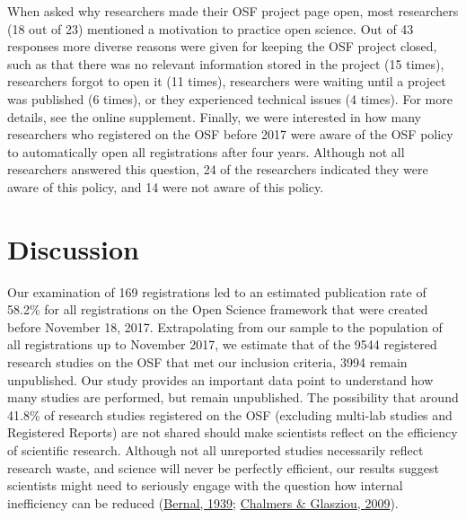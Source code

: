 \documentclass[
  ,jou, a4paper,floatsintext]{apa6}
\begin{document}
When asked why researchers made their OSF project page open, most researchers (18 out of 23) mentioned a motivation to practice open science. Out of 43 responses more diverse reasons were given for keeping the OSF project closed, such as that there was no relevant information stored in the project (15 times), researchers forgot to open it (11 times), researchers were waiting until a project was published (6 times), or they experienced technical issues (4 times). For more details, see the online supplement. Finally, we were interested in how many researchers who registered on the OSF before 2017 were aware of the OSF policy to automatically open all registrations after four years. Although not all researchers answered this question, 24 of the researchers indicated they were aware of this policy, and 14 were not aware of this policy.

\hypertarget{discussion}{%
\section{Discussion}\label{discussion}}

Our examination of 169 registrations led to an estimated publication rate of 58.2\% for all registrations on the Open Science framework that were created before November 18, 2017. Extrapolating from our sample to the population of all registrations up to November 2017, we estimate that of the 9544 registered research studies on the OSF that met our inclusion criteria, 3994 remain unpublished. Our study provides an important data point to understand how many studies are performed, but remain unpublished. The possibility that around 41.8\% of research studies registered on the OSF (excluding multi-lab studies and Registered Reports) are not shared should make scientists reflect on the efficiency of scientific research. Although not all unreported studies necessarily reflect research waste, and science will never be perfectly efficient, our results suggest scientists might need to seriously engage with the question how internal inefficiency can be reduced (\protect\hyperlink{ref-bernal_social_1939}{Bernal, 1939}; \protect\hyperlink{ref-chalmers_avoidable_2009}{Chalmers \& Glasziou, 2009}).
\end{document}
